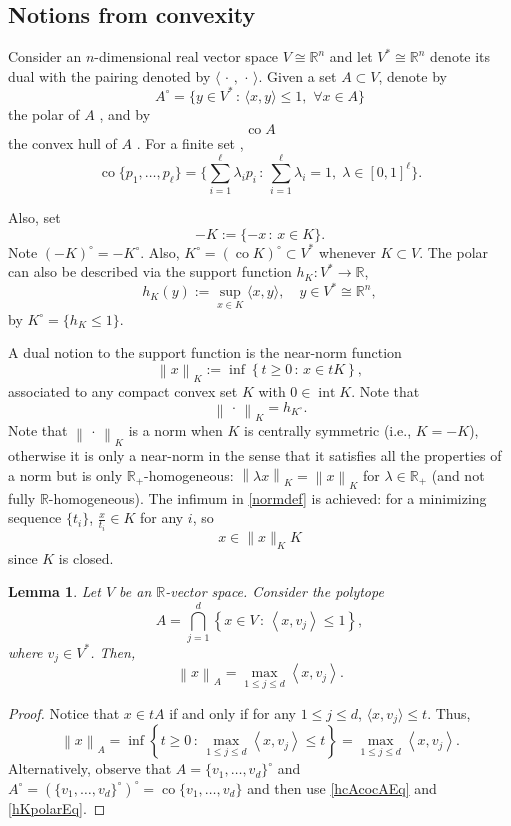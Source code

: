 \documentclass{article}
\newcommand{\RR}{{\mathbb R}}
\renewcommand{\>}{\rightarrow}
\DeclareMathOperator{\Int}{int}
\DeclareMathOperator{\co}{co}
\theoremstyle{plain}
\newtheorem{lemma}[theorem]{Lemma}
\theoremstyle{definition}
\newcommand{\beq}{\begin{equation}}
\newcommand{\eeq}{\end{equation}}
\newcommand{\blem}{\begin{lemma}}
\newcommand{\elem}{\end{lemma}}
\def\lb#1{\label{#1}}
\def\ra{\rightarrow}
\def\ran{\rangle}
\def\lan{\langle}
\def\texts{\textstyle}
\begin{document}
\subsection{Notions from convexity}

Consider an $n$-dimensional real vector space $V\cong\RR^n$
and let $V^*\cong\RR^n$ denote its dual with the pairing denoted
by $\lan\,\cdot\,,\,\cdot\,\ran$.
Given a set $A\subset V$, denote by   
$$
A^\circ=\{y\in V^*\,:\, \langle x,y\rangle\le1,
\,\, \forall x\in A\}
$$
the polar of $A$ \cite[p. 125]{Rock}, and by
\beq
\lb{coA}
\co A
\eeq
the convex hull of $A$ \cite[p. 12]{Rock}. For a finite set \cite[Theorem 2.3]{Rock},
\beq
\lb{coAFiniteSet}
\co \{p_1,\ldots,p_\ell\}=
\Big\{\texts
\sum_{i=1}^\ell\lambda_ip_i\,:\,  \sum_{i=1}^\ell\lambda_i=1,
\; \lambda\in[0,1]^\ell
\Big\}.
\eeq


Also, set
$$
-K:=\{-x\,:\, x\in K\}.
$$
Note $(-K)^\circ=-K^\circ$. Also, $K^\circ=(\co K)^\circ\subset V^*$ whenever $K\subset V$.
The polar can also be described via the support function
$h_K:V^*\ra \RR$,
\beq
\lb{hKEq}
h_K(y):=\sup_{x\in K}\langle x,y\rangle, \quad y\in V^*\cong\RR^n,
\eeq
by
$K^\circ=\{h_K\le 1\}$.

A dual notion to the support function is the near-norm function
    \begin{equation}\label{normdef}
        \left\|x\right\|_K:=\inf\left\{t\geq0\,:\,x\in tK\right\},
    \end{equation}
associated to any compact convex set $K$ with $0\in\Int K$.
    Note that \cite[Corollary 14.5]{Rock}
\beq
\lb{hKpolarEq}
\left\|\,\cdot\,\right\|_K=h_{K^\circ}.
\eeq
Note that $\left\|\,\cdot\,\right\|_K$ is a norm when $K$
is centrally symmetric (i.e., $K=-K$), otherwise it is only a near-norm
in the sense that it satisfies all the properties of a norm
but is only \hbox{$\RR_{+}$-homogeneous:} $\left\|\lambda x\right\|_K=\left\|x\right\|_K$
for $\lambda\in\RR_+$ (and not fully $\RR$-homogeneous).
    The infimum in \eqref{normdef} is achieved:  for a minimizing sequence
    $\{t_i\}$, $\frac{x}{t_i}\in K$ for any $i$, so 
\beq
\lb{infachievedEq}
x\in\|x\|_KK
\eeq
since $K$ is closed.

\blem
    Let $V$ be an $\RR$-vector space. Consider the polytope
    $$
        A=\bigcap_{j=1}^d\left\{x\in V\,:\,\left\langle x,v_j\right\rangle\leq1\right\},
    $$
    where $v_j\in V^*$. Then,
    $$
        \left\|x\right\|_A=\max_{1\leq j\leq d}\left\langle x,v_j\right\rangle.
    $$
\elem
\begin{proof}
    Notice that $x\in tA$ if and only if for any $1\leq j\leq d$, $\langle x,v_j\rangle\leq t$. Thus,
    $$
        \left\|x\right\|_A=\inf\left\{t\geq0\,:\,\max_{1\leq j\leq d}\left\langle x,v_j\right\rangle\leq t\right\}=\max_{1\leq j\leq d}\left\langle x,v_j\right\rangle.
    $$
Alternatively, observe that 
$A=\{v_1,\ldots,v_d\}^\circ$ and 
$A^\circ=(\{v_1,\ldots,v_d\}^\circ)^\circ=\co\{v_1,\ldots,v_d\}$
\cite[Theorem 14.5]{Rock} and then use \eqref{hcAcocAEq} and \eqref{hKpolarEq}.
\end{proof}
\end{document}
